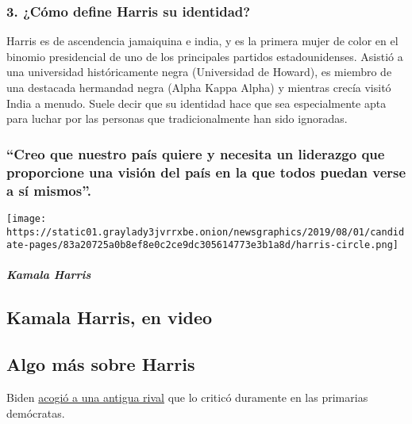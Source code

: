 \hypertarget{3-cuxf3mo-define-harris-su-identidad}{%
\subsubsection{\texorpdfstring{\textbf{3. ¿Cómo define Harris su
identidad?}}{3. ¿Cómo define Harris su identidad?}}\label{3-cuxf3mo-define-harris-su-identidad}}

Harris es de ascendencia jamaiquina e india, y es la primera mujer de
color en el binomio presidencial de uno de los principales partidos
estadounidenses. Asistió a una universidad históricamente negra
(Universidad de Howard), es miembro de una destacada hermandad negra
(Alpha Kappa Alpha) y mientras crecía visitó India a menudo. Suele decir
que su identidad hace que sea especialmente apta para luchar por las
personas que tradicionalmente han sido ignoradas.

\hypertarget{creo-que-nuestro-pauxeds-quiere-y-necesita-un-liderazgo-que-proporcione-una-visiuxf3n-del-pauxeds-en-la-que-todos-puedan-verse-a-suxed-mismos}{%
\subsubsection{``Creo que nuestro país quiere y necesita un liderazgo
que proporcione una visión del país en la que todos puedan verse a sí
mismos''.}\label{creo-que-nuestro-pauxeds-quiere-y-necesita-un-liderazgo-que-proporcione-una-visiuxf3n-del-pauxeds-en-la-que-todos-puedan-verse-a-suxed-mismos}}

\texttt{[image: https://static01.graylady3jvrrxbe.onion/newsgraphics/2019/08/01/candidate-pages/83a20725a0b8ef8e0c2ce9dc305614773e3b1a8d/harris-circle.png]}

\hypertarget{kamala-harris-1}{%
\subparagraph{Kamala Harris}\label{kamala-harris-1}}

\hypertarget{kamala-harris-en-video}{%
\subsection{Kamala Harris, en video}\label{kamala-harris-en-video}}

\hypertarget{algo-muxe1s-sobre-harris}{%
\subsection{Algo más sobre Harris}\label{algo-muxe1s-sobre-harris}}

Biden
\href{https://www.nytimes3xbfgragh.onion/2020/08/11/us/politics/kamala-harris-vp-biden.html}{acogió
a una antigua rival} que lo criticó duramente en las primarias
demócratas.

